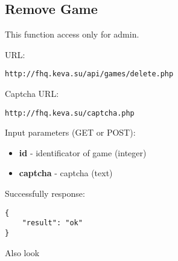 \subsection{Remove Game}
\par

This function access only for admin.

URL:
\begin{Verbatim}[frame=single]
http://fhq.keva.su/api/games/delete.php
\end{Verbatim}

Captcha URL:
\begin{Verbatim}[frame=single]
http://fhq.keva.su/captcha.php
\end{Verbatim}


Input parameters (GET or POST):
\begin{itemize}
  \item \textbf{id} - identificator of game (integer)
  \item \textbf{captcha} - captcha (text)
\end{itemize}

Successfully response:  \\
\begin{Verbatim}[frame=single]
{
    "result": "ok"
}
\end{Verbatim}

Also look ~
